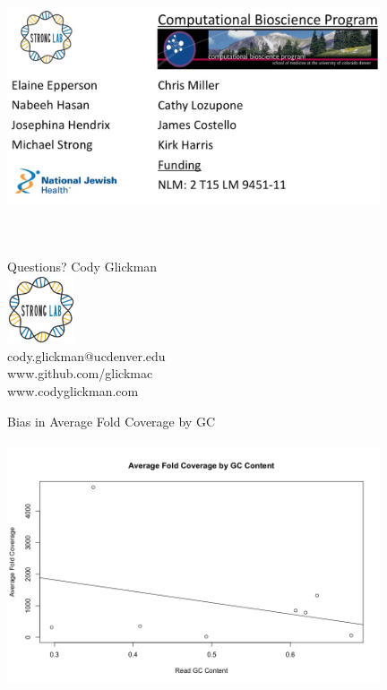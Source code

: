 \documentclass[11pt]{beamer}
\begin{document}
	
	
	
	\begin{frame}{}
	\vspace{1cm}
	{\includegraphics[height=8cm, width=11cm]{Acknowledgements.png} }
	\end{frame}
	
	
	\begin{frame}{Questions?}
	\center
	Cody Glickman \\ \includegraphics[height=2cm, width=2cm]{lablogo.png} \\ cody.glickman@ucdenver.edu \\ \alert{www.github.com/glickmac} \\ www.codyglickman.com
	\end{frame}
	
	
	\begin{frame}{Bias in Average Fold Coverage by GC}
	\includegraphics[height=8cm, width=11cm]{Viral_Coverage_by_GC.png}
	\end{frame}
	
\end{document}
